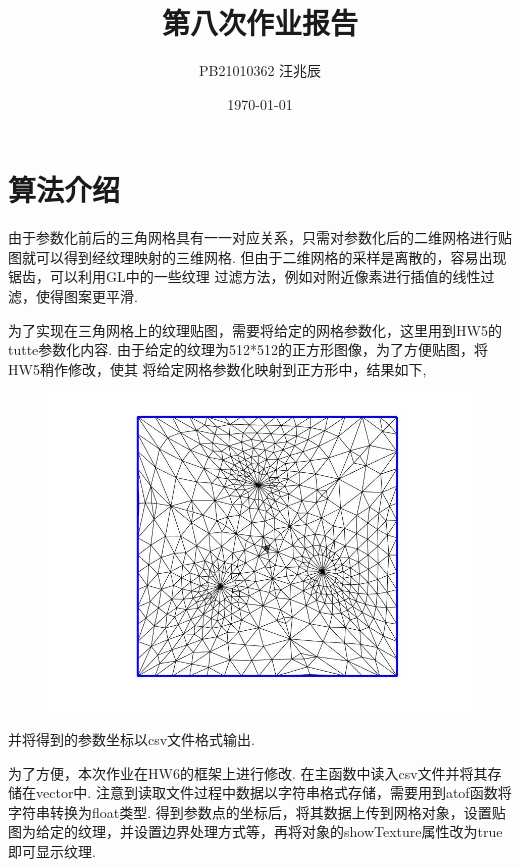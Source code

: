 \documentclass[12pt]{article}
\title{第八次作业报告}
\author{PB21010362 汪兆辰}
\date{\today}
\begin{document}
\maketitle

\section{算法介绍}

由于参数化前后的三角网格具有一一对应关系，只需对参数化后的二维网格进行贴图就可以得到经纹理映射的三维网格. 但由于二维网格的采样是离散的，容易出现锯齿，可以利用GL中的一些纹理
过滤方法，例如对附近像素进行插值的线性过滤，使得图案更平滑.

为了实现在三角网格上的纹理贴图，需要将给定的网格参数化，这里用到HW5的tutte参数化内容. 由于给定的纹理为512*512的正方形图像，为了方便贴图，将HW5稍作修改，使其
将给定网格参数化映射到正方形中，结果如下,
\begin{figure}[htbp]
    \centering
    \includegraphics[scale=0.5]{pic01.jpg}
\end{figure}
并将得到的参数坐标以csv文件格式输出.

为了方便，本次作业在HW6的框架上进行修改. 在主函数中读入csv文件并将其存储在vector中. 注意到读取文件过程中数据以字符串格式存储，需要用到atof函数将字符串转换为float类型. 
得到参数点的坐标后，将其数据上传到网格对象，设置贴图为给定的纹理，并设置边界处理方式等，再将对象的showTexture属性改为true即可显示纹理.
\end{document}
